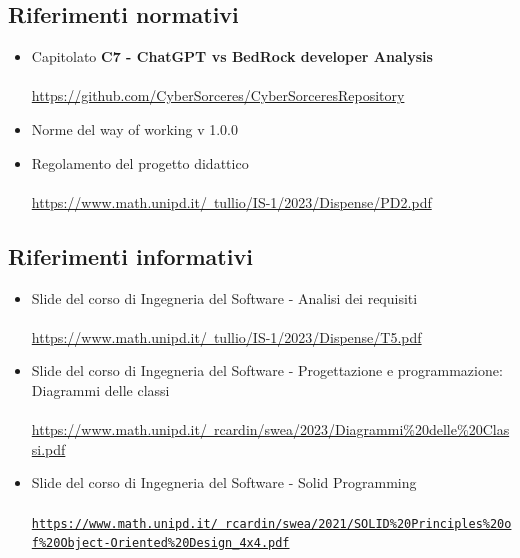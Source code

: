 \documentclass{article}
\begin{document}
{\subsection{Riferimenti normativi}
\begin{itemize}
    \item Capitolato \textbf{C7 - ChatGPT vs BedRock developer Analysis}
    \\ \\
       \href{https://github.com/CyberSorceres/CyberSorceresRepository}{https://github.com/CyberSorceres/CyberSorceresRepository} 
    \item Norme del way of working v 1.0.0
    \item Regolamento del progetto didattico \\ \\ \href{https://www.math.unipd.it/~tullio/IS-1/2023/Dispense/PD2.pdf} 
    {https://www.math.unipd.it/~tullio/IS-1/2023/Dispense/PD2.pdf}
\end{itemize}
\subsection{Riferimenti informativi}
\begin{itemize}
    \item Slide del corso di Ingegneria del Software - Analisi dei requisiti \\ \\
    \href{https://www.math.unipd.it/~tullio/IS-1/2023/Dispense/T5.pdf}{https://www.math.unipd.it/~tullio/IS-1/2023/Dispense/T5.pdf}
    \item Slide del corso di Ingegneria del Software - Progettazione e programmazione: Diagrammi delle classi \\ \\
\href{https://www.math.unipd.it/~rcardin/swea/2023/Diagrammi%20delle%20Classi.pdf}{https://www.math.unipd.it/~rcardin/swea/2023/Diagrammi\%20delle\%20Classi.pdf}
    \item Slide del corso di Ingegneria del Software - Solid Programming \\ \\
\href{https://www.math.unipd.it/~rcardin/swea/2021/SOLID\%20Principles\%20of\%20Object-Oriented\%20Design_4x4.pdf}{\texttt{https://www.math.unipd.it/~rcardin/swea/2021/SOLID\%20Principles\%20of\%20Object-Oriented\%20Design\_4x4.pdf}}
\end{itemize}

}
\end{document}
